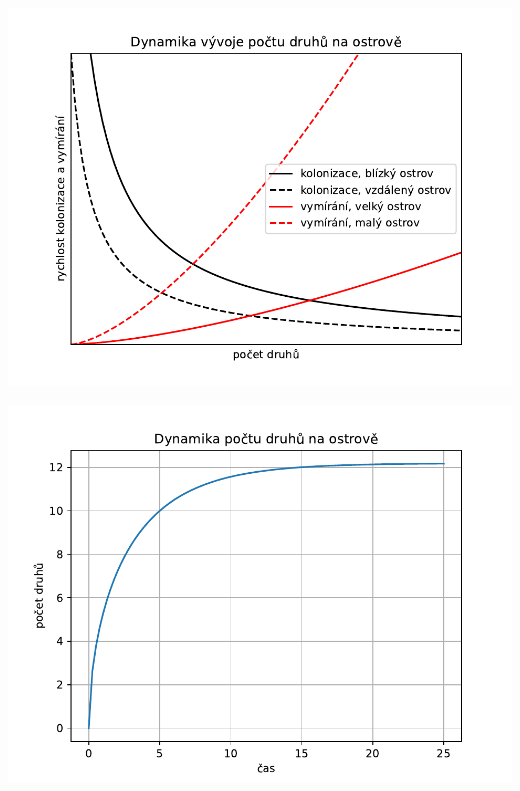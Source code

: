 \documentclass{article}
\begin{document}
\begin{minipage}[t]{0.5\linewidth}
  \includegraphics[width=\linewidth]{ostrov1.pdf}
\end{minipage}\begin{minipage}[t]{0.5\linewidth}
  \includegraphics[width=\linewidth]{ostrov2.pdf}
\end{minipage}
\end{document}
